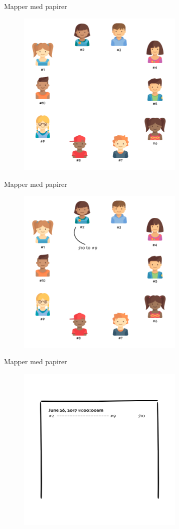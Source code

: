 \documentclass[usenames, dvipsnames]{beamer}
\begin{document}
  \begin{frame}{Mapper med papirer}
    \begin{figure}[ht!]
    \centering
        \includegraphics[width=80mm]{images/all_people.png}
    \end{figure}
  \end{frame}
  \begin{frame}{Mapper med papirer}
    \begin{figure}[ht!]
    \centering
    \includegraphics[width=80mm]{images/all_people_send.png}
    \end{figure}
  \end{frame}
  \begin{frame}{Mapper med papirer}
    \begin{figure}[ht!]
    \centering
    \includegraphics[width=80mm]{images/all_people_transaction.png}
    \end{figure}
  \end{frame}
\end{document}
